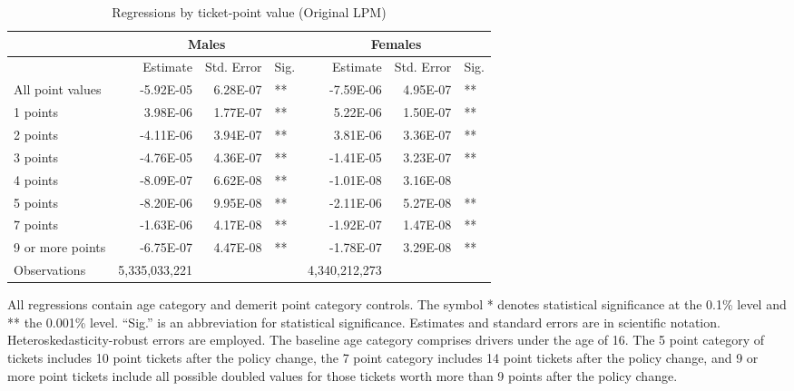 
\begin{table}%
\centering 
\begin{tabular}{l r r l r r l} 

\hline 
 
 & \multicolumn{3}{c}{Males} & \multicolumn{3}{c}{Females} \\ 

\hline 
 
 & Estimate & Std. Error & Sig. & Estimate & Std. Error & Sig. \\ 

\hline 
 
All point values                &  -5.92E-05        &  6.28E-07       &   **       &  -7.59E-06        &  4.95E-07       &   **       \\ 
1 points                        &  3.98E-06        &  1.77E-07       &   **       &  5.22E-06        &  1.50E-07       &   **       \\ 
2 points                        &  -4.11E-06        &  3.94E-07       &   **       &  3.81E-06        &  3.36E-07       &   **       \\ 
3 points                        &  -4.76E-05        &  4.36E-07       &   **       &  -1.41E-05        &  3.23E-07       &   **       \\ 
4 points                        &  -8.09E-07        &  6.62E-08       &   **       &  -1.01E-08        &  3.16E-08       &            \\ 
5 points                        &  -8.20E-06        &  9.95E-08       &   **       &  -2.11E-06        &  5.27E-08       &   **       \\ 
7 points                        &  -1.63E-06        &  4.17E-08       &   **       &  -1.92E-07        &  1.47E-08       &   **       \\ 
9 or more points                &  -6.75E-07        &  4.47E-08       &   **       &  -1.78E-07        &  3.29E-08       &   **       \\ 
Observations            & 5,335,033,221    &          &              &  4,340,212,273 \\ 


\hline 

\end{tabular} 
\caption{Regressions by ticket-point value (Original LPM)} 
All regressions contain age category and demerit point category controls. 
The symbol * denotes statistical significance at the 0.1\% level 
and ** the 0.001\% level. 
``Sig.'' is an abbreviation for statistical significance. 
Estimates and standard errors are in scientific notation. 
Heteroskedasticity-robust errors are employed. 
The baseline age category comprises drivers under the age of 16. 
The 5 point category of tickets includes 10 point tickets after the policy change,  
the 7 point category includes 14 point tickets after the policy change,  
and 9 or more point tickets include all possible doubled values for those tickets  
worth more than 9 points after the policy change. 
\label{tab:orig_regs_by_points} 
\end{table} 
 
